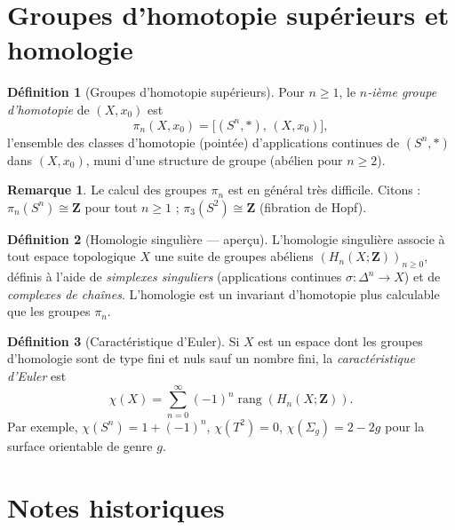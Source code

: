 \documentclass[12pt,a4paper,openany]{book}
\theoremstyle{definition}
\newtheorem{definition}{Définition}[chapter]
\theoremstyle{cours}
\theoremstyle{coursnormal}
\newtheorem{remarque}[theoreme]{Remarque}
\begin{document}
\section{Groupes d'homotopie supérieurs et homologie}
\label{sec:homotopie-superieure-homologie}

\begin{definition}[Groupes d'homotopie supérieurs]
\label{def:pin}
Pour $n\ge 1$, le \emph{$n$-ième groupe d'homotopie} de $(X,x_0)$ est
\[
\pi_n(X,x_0) = \bigl[(S^n,*),\,(X,x_0)\bigr],
\]
l'ensemble des classes d'homotopie (pointée) d'applications continues
de $(S^n,*)$ dans $(X,x_0)$, muni d'une structure de groupe
(abélien pour $n\ge 2$).
\end{definition}

\begin{remarque}
\label{rem:pi-n-exemples}
Le calcul des groupes $\pi_n$ est en général très difficile. Citons :
$\pi_n(S^n)\cong\mathbf{Z}$ pour tout $n\ge 1$ ;
$\pi_3(S^2)\cong\mathbf{Z}$ (fibration de Hopf).
\end{remarque}

\begin{definition}[Homologie singulière --- aperçu]
\label{def:homologie-apercu}
L'homologie singulière associe à tout espace topologique $X$ une suite
de groupes abéliens $(H_n(X;\mathbf{Z}))_{n\ge 0}$, définis à l'aide
de \emph{simplexes singuliers} (applications continues
$\sigma\colon\Delta^n\to X$) et de \emph{complexes de chaînes}.
L'homologie est un invariant d'homotopie plus calculable que les
groupes $\pi_n$.
\end{definition}

\begin{definition}[Caractéristique d'Euler]
\label{def:euler}
Si $X$ est un espace dont les groupes d'homologie sont de type fini et
nuls sauf un nombre fini, la \emph{caractéristique d'Euler} est
\[
\chi(X)=\sum_{n=0}^{\infty}(-1)^n\operatorname{rang}(H_n(X;\mathbf{Z})).
\]
Par exemple, $\chi(S^n)=1+(-1)^n$, $\chi(T^2)=0$,
$\chi(\Sigma_g)=2-2g$ pour la surface orientable de genre $g$.
\end{definition}

\section{Notes historiques}
\label{sec:notes-historiques-topo-alg}
\end{document}
